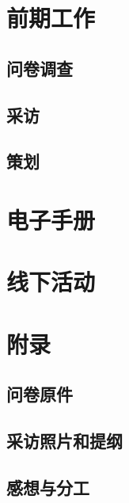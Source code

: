 \documentclass{amznotes}
\begin{document}
    \setlength{\parindent}{2em}
    
    \setcounter{tocdepth}{1}
    \tableofcontents
    \chapter{前期工作}
    \section{问卷调查}
    
    \section{采访}
    
    \section{策划}
    
    \clearpage
    \chapter{电子手册}
    \label{books}
    
    \clearpage
    \chapter{线下活动}
    \label{activity}
    
    \clearpage
    \appendix
    \chapter{附录}
    \section{问卷原件}
    
    \section{采访照片和提纲}
    
    \section{感想与分工}
    
\end{document}
